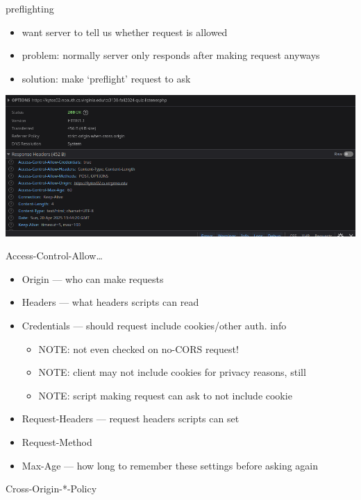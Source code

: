 
\begin{frame}{preflighting}
    \begin{itemize}
    \item want server to tell us whether request is allowed
    \item problem: normally server only responds after making request anyways
    \vspace{.5cm}
    \item solution: make `preflight' request to ask
    \end{itemize}
\includegraphics[height=0.5\textheight]{../web/cors-preflight-ex}
\end{frame}

\begin{frame}{Access-Control-Allow\ldots}
    \begin{itemize}
    \item Origin --- who can make requests
    \item Headers --- what headers scripts can read
    \item Credentials --- should request include cookies/other auth. info
        \begin{itemize}
        \item NOTE: not even checked on no-CORS request!
        \item NOTE: client may not include cookies for privacy reasons, still
        \item NOTE: script making request can ask to not include cookie
        \end{itemize}
    \item Request-Headers --- request headers scripts can set
    \item Request-Method
    \item Max-Age --- how long to remember these settings before asking again
    \end{itemize}
\end{frame}


\begin{frame}{Cross-Origin-*-Policy}
    
\end{frame}

